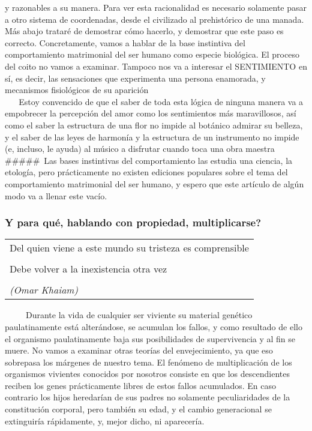 y razonables a su manera. Para ver esta racionalidad es necesario
solamente pasar a otro sistema de coordenadas, desde el civilizado al
prehistórico de una manada. Más abajo trataré de demostrar cómo hacerlo,
y demostrar que este paso es correcto. Concretamente, vamos a hablar de
la base instintiva del comportamiento matrimonial del ser humano como
especie biológica. El proceso del coito no vamos a examinar. Tampoco nos
va a interesar el SENTIMIENTO en sí, es decir, las sensaciones que
experimenta una persona enamorada, y mecanismos fisiológicos de su
aparición\\
\hspace*{0.333em} ~ ~ Estoy convencido de que el saber de toda esta
lógica de ninguna manera va a empobrecer la percepción del amor como los
sentimientos más maravillosos, así como el saber la estructura de una
flor no impide al botánico admirar su belleza, y el saber de las leyes
de harmonía y la estructura de un instrumento no impide (e, incluso, le
ayuda) al músico a disfrutar cuando toca una obra maestra\\
\#\#\#\#\#~Las bases instintivas del comportamiento las estudia una
ciencia, la etología, pero prácticamente no existen ediciones populares
sobre el tema del comportamiento matrimonial del ser humano, y espero
que este artículo de algún modo va a llenar este vacío.

\protect\hypertarget{M1A}{}{}

\subsubsection{Y para qué, hablando con propiedad,
multiplicarse?}\label{y-para-quuxe9-hablando-con-propiedad-multiplicarse}

\begin{longtable}[]{@{}l@{}}
\toprule
Del quien viene a este mundo su tristeza es comprensible\tabularnewline
\tabularnewline
Debe volver a la inexistencia otra vez\tabularnewline
\tabularnewline
\emph{(Omar Khaiam)}\tabularnewline
\bottomrule
\end{longtable}

~ ~ ~ Durante la vida de cualquier ser viviente su material genético
paulatinamente está alterándose, se acumulan los fallos, y como
resultado de ello el organismo paulatinamente baja sus posibilidades de
supervivencia y al fin se muere. No vamos a examinar otras teorías del
envejecimiento, ya que eso sobrepasa los márgenes de nuestro tema. El
fenómeno de multiplicación de los organismos vivientes conocidos por
nosotros consiste en que los descendientes reciben los genes
prácticamente libres de estos fallos acumulados. En caso contrario los
hijos heredarían de sus padres no solamente peculiaridades de la
constitución corporal, pero también su edad, y el cambio generacional se
extinguiría rápidamente, y, mejor dicho, ni aparecería.

